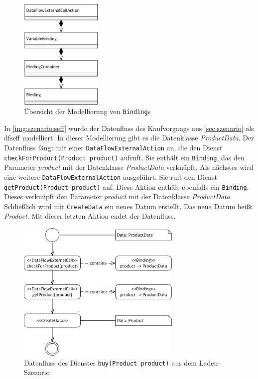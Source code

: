 \begin{figure}[h]
	\centering
  	\includegraphics[width=0.35\textwidth]{images/meta_dfseff_bindings.png}
	\caption{Übersicht der Modellierung von \texttt{Binding}s}
	\label{img:modell:dfseff:bindings}
\end{figure}
In \autoref{img:szenario:seff} wurde der Datenfluss des Kaufvorgangs aus \autoref{sec:szenario} als \gls{dfseff} modelliert. In dieser Modellierung gibt es die Datenklasse \textit{ProductData}. Der Datenfluss fängt mit einer \texttt{DataFlowExternalAction} an, die den Dienst \texttt{checkForProduct(Product product)} aufruft. Sie enthält ein \texttt{Binding}, das den Parameter \textit{product} mit der Datenklasse \textit{ProductData} verknüpft. Als nächstes wird eine weitere \texttt{DataFlowExternalAction} ausgeführt. Sie ruft den Dienst \texttt{getProduct(Product product)} auf. Diese Aktion enthält ebenfalls ein \texttt{Binding}. Dieses verknüpft den Parameter \textit{product} mit der Datenklasse \textit{ProductData}. Schließlich wird mit \texttt{CreateData} ein neues Datum erstellt. Das neue Datum heißt \textit{Product}. Mit dieser letzten Aktion endet der Datenfluss.

\begin{figure}[h]
	\centering
  	\includegraphics[width=0.7\textwidth]{images/szenario_seff.png}
	\caption{Datenfluss des Dienstes \texttt{buy(Product product)} aus dem Laden-Szenario}
	\label{img:szenario:seff}
\end{figure}

